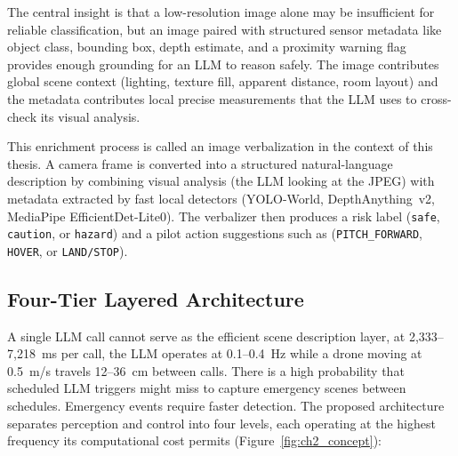 The central insight is that a low-resolution image alone may be insufficient for reliable classification, but an image paired with structured sensor metadata like object class, bounding box, depth estimate, and a proximity warning flag provides enough grounding for an LLM to reason safely. 
The image contributes global scene context (lighting, texture
fill, apparent distance, room layout) and the metadata contributes local precise measurements that the LLM uses to cross-check its visual analysis.

This enrichment process is called an image verbalization in the context of this thesis. 
A camera frame is converted into a structured natural-language description by combining visual analysis (the LLM looking at the JPEG) with metadata extracted by fast local detectors (YOLO-World, DepthAnything~v2, MediaPipe EfficientDet-Lite0). 
The verbalizer then produces a risk label (\texttt{safe}, \texttt{caution}, or \texttt{hazard}) and a pilot action suggestions such as (\texttt{PITCH\_FORWARD}, \texttt{HOVER}, or \texttt{LAND/STOP}).

\subsection{Four-Tier Layered Architecture}
\label{sec:ch2_proposed_tiers}

A single LLM call cannot serve as the efficient scene description layer, at 2,333--7,218~ms per call, the LLM operates at 0.1--0.4~Hz while a drone moving at 0.5~m/s travels 12--36~cm between calls. 
There is a high probability that scheduled LLM triggers might miss to capture emergency scenes between schedules.
Emergency events require faster detection. 
The proposed architecture separates perception and control
into four levels, each operating at the highest frequency its computational cost permits (Figure~\ref{fig:ch2_concept}):

